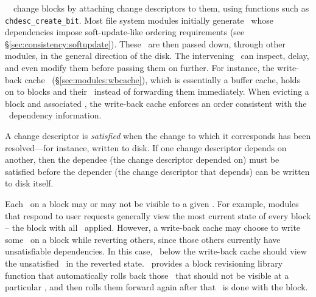 \Kudos\ \modules\ change blocks by attaching change descriptors to them,
using functions such as \texttt{chdesc\_create\_bit}.
%
Most file system modules initially generate \chdescs\ whose
dependencies impose soft-update-like ordering requirements (see
\S\ref{sec:consistency:softupdate}).  These \chdescs\ are then passed down,
through other modules, in the general direction of the disk.  The
intervening \modules\ can
inspect, delay, and even modify them before passing them on further. For
instance, the write-back cache \module\ (\S\ref{sec:modules:wbcache}),
which is essentially a buffer cache, holds
on to blocks and their \chdescs\ instead of forwarding them
immediately. When evicting a block and associated \chdescs, the write-back
cache enforces an order consistent with the \chdesc\ dependency
information.

A change descriptor is \emph{satisfied} when the change to which it
 corresponds has been resolved---for instance, written to disk.
%
If one change descriptor depends on another, then the dependee (the change
 descriptor depended on) must be satisfied before the depender (the change
 descriptor that depends) can be written to disk itself.



Each \chdesc\ on a block may or may not be visible to a given \module.
%
For example, modules that respond to user requests generally view the most
 current state of every block -- the block with all \chdescs\ applied.
%
However, a write-back cache may choose to write some \chdescs\ on a block
 while reverting others, since those others currently have unsatisfiable
 dependencies.
%
In this case, \modules\ below the write-back cache should view the
 unsatisfied \chdescs\ in the reverted state.
%
%
\Kudos\ provides a block revisioning library function that automatically rolls back those
 \chdescs\ that should not be visible at a particular \module, and then
 rolls them forward again after that \module\ is done with the block.



